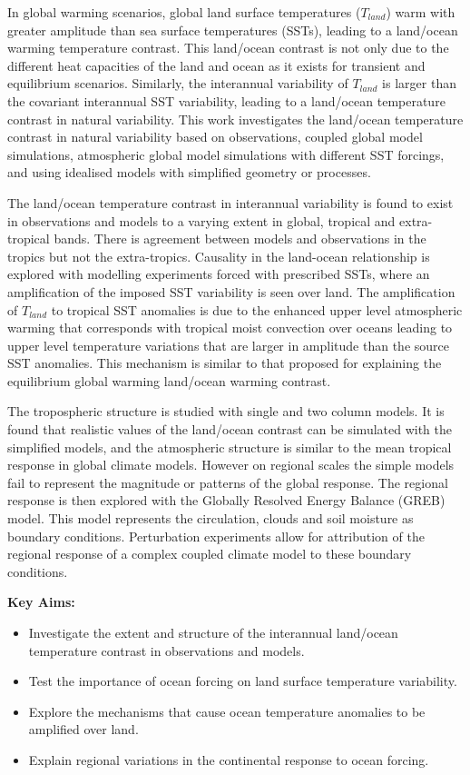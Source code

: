 In global warming scenarios, global land surface temperatures ($T_{land}$) warm 
with greater amplitude than sea surface temperatures (SSTs), leading to a 
land/ocean warming temperature contrast. This land/ocean contrast is not only 
due to the different heat capacities of the land and ocean as it exists for 
transient and equilibrium scenarios.  Similarly, the interannual variability of 
$T_{land}$ is larger than the covariant interannual SST variability, leading to 
a land/ocean temperature contrast in natural variability.  This work 
investigates the land/ocean temperature contrast in natural variability based on 
observations, coupled global model simulations, atmospheric global model 
simulations with different SST forcings, and using idealised models with 
simplified geometry or processes.

The land/ocean temperature contrast in interannual variability is found to exist 
in observations and models to a varying extent in global, tropical and 
extra-tropical bands. There is agreement between models and observations in the 
tropics but not the extra-tropics. Causality in the land-ocean relationship is 
explored with modelling experiments forced with prescribed SSTs, where an 
amplification of the imposed SST variability is seen over land.  The 
amplification of $T_{land}$ to tropical SST anomalies is due to the enhanced 
upper level atmospheric warming that corresponds with tropical moist convection 
over oceans leading to upper level temperature variations that are larger in 
amplitude than the source SST anomalies. This mechanism is similar to that 
proposed for explaining the equilibrium global warming land/ocean warming 
contrast.

The tropospheric structure is studied with single and two column models. It is 
found that realistic values of the land/ocean contrast can be simulated with the 
simplified models, and the atmospheric structure is similar to the mean tropical 
response in global climate models. However on regional scales the simple models 
fail to represent the magnitude or patterns of the global response. The regional 
response is then explored with the Globally Resolved Energy Balance (GREB) 
model.  This model represents the circulation, clouds and soil moisture as 
boundary conditions. Perturbation experiments allow for attribution of the 
regional response of a complex coupled climate model to these boundary 
conditions.

\pagebreak
\textbf{Key Aims:}
\begin{itemize}
	\item Investigate the extent and structure of the interannual land/ocean 
		temperature contrast in observations and models.
	\item Test the importance of ocean forcing on land surface temperature 
		variability.
	\item Explore the mechanisms that cause ocean temperature anomalies to be 
		amplified over land.
	\item Explain regional variations in the continental response to ocean 
		forcing.
\end{itemize}

